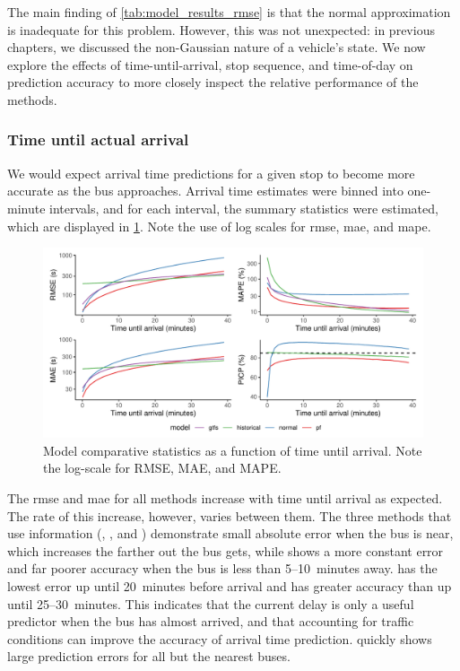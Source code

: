 The main finding of \cref{tab:model_results_rmse} is that the normal approximation is inadequate for this problem. However, this was not unexpected: in previous chapters, we discussed the non-Gaussian nature of a vehicle's state. We now explore the effects of time-until-arrival, stop sequence, and time-of-day on prediction accuracy to more closely inspect the relative performance of the methods.


\subsubsection{Time until actual arrival}

We would expect arrival time predictions for a given stop to become more accurate as the bus approaches. Arrival time estimates were binned into one-minute intervals, and for each interval, the summary statistics were estimated, which are displayed in \cref{fig:model_results_rmse_time}. Note the use of log scales for \gls{rmse}, \gls{mae}, and \gls{mape}.


\begin{knitrout}\small
{}\color{fgcolor}\begin{figure}
\includegraphics[width=\textwidth]{figure/model_results_rmse_time-1} \caption[Model comparative statistics as a function of time until arrival]{Model comparative statistics as a function of time until arrival. Note the log-scale for RMSE, MAE, and MAPE.}\label{fig:model_results_rmse_time}
\end{figure}


\end{knitrout}

The \gls{rmse} and \gls{mae} for all methods increase with time until arrival as expected. The rate of this increase, however, varies between them. The three methods that use \rt{} information (\Fpf{}, \Fnorm{}, and \Fsched{}) demonstrate small absolute error when the bus is near, which increases the farther out the bus gets, while \Fhist{} shows a more constant error and far poorer accuracy when the bus is less than 5--10~minutes away. \Fpf{} has the lowest error up until 20~minutes before arrival and has greater accuracy than \Fsched{} up until 25--30~minutes. This indicates that the current delay is only a useful predictor when the bus has almost arrived, and that accounting for \rt{} traffic conditions can improve the accuracy of arrival time prediction. \Fnorm{} quickly shows large prediction errors for all but the nearest buses.



